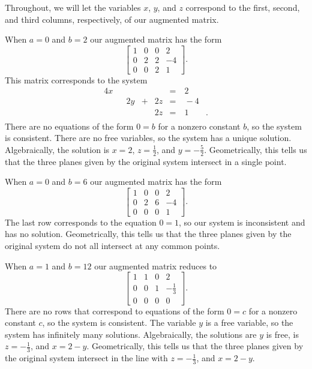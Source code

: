 \begin{example}
\ExampleSolution Throughout, we will let the variables $x$, $y$, and $z$ correspond to the first, second, and third columns, respectively, of our augmented matrix.  
\ba
\item When $a=0$ and $b=2$ our augmented matrix has the form 
\[ \left[ \begin{array}{ccc|r} 1&0&0&2 \\ 0&2&2&-4 \\ 0&0&2&1 \end{array} \right].\]
This matrix corresponds to the system
\begin{alignat*}{4}
{}x	&{}{} 		&{}		&{}{}		&{}		 &{}= & \ 2&{} \\
{}	&{}{} 		&{2}y	&{}+{}	&{2}z	 &{}= & \ -4&{} \\
{}	&{}{} 		&{}		&{}{}		&{2}z	&{}= & \ 1&{.} \\
\end{alignat*} 
There are no equations of the form $0 = b$ for a nonzero constant $b$, so the system is consistent. There are no free variables, so the system has a unique solution. Algebraically, the solution is $x = 2$, $z = \frac{1}{2}$, and $y = -\frac{5}{2}$. Geometrically, this tells us that the three planes given by the original system intersect in a single point. 
\item When $a=0$ and $b=6$ our augmented matrix has the form 
\[ \left[ \begin{array}{ccc|r} 1&0&0&2 \\ 0&2&6&-4 \\ 0&0&0&1 \end{array} \right].\]
The last row corresponds to the equation $0 = 1$, so our system is inconsistent and has no solution. Geometrically, this tells us that the three planes given by the original system do not all intersect at any common points.
\item When $a=1$ and $b=12$ our augmented matrix reduces to  
\[ \renewcommand{\arraystretch}{1.4} \left[ \begin{array}{ccc|r} 1&1&0&2 \\ 0&0&1&-\frac{1}{3} \\ 0&0&0&0 \end{array} \right].\]
There are no rows that correspond to equations of the form $0 = c$ for a nonzero constant $c$, so the system is consistent. The variable $y$ is a free variable, so the system has infinitely many solutions. Algebraically, the solutions are $y$ is free, is $z = -\frac{1}{3}$, and $x = 2-y$.  Geometrically, this tells us that the three planes given by the original system intersect in the line with $z = -\frac{1}{3}$, and $x = 2-y$.  

\ea

\end{example}

